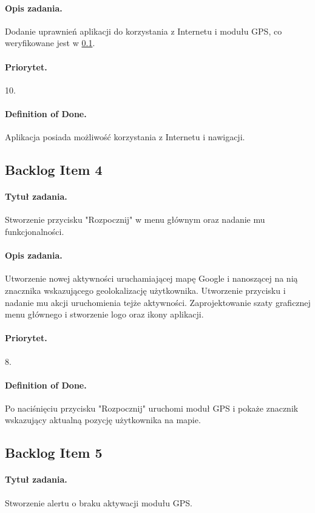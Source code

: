 \documentclass[a4paper]{article}
\begin{document}
\paragraph{Opis zadania.} Dodanie uprawnień aplikacji do korzystania z Internetu i modułu GPS, co weryfikowane jest w \ref{bl4}.
\paragraph{Priorytet.} 10.
\paragraph{Definition of Done.} Aplikacja posiada możliwość korzystania z Internetu i nawigacji.

\subsection{Backlog Item 4}
\label{bl4}
\paragraph{Tytuł zadania.} Stworzenie przycisku "Rozpocznij" w menu głównym oraz nadanie mu funkcjonalności.
\paragraph{Opis zadania.} Utworzenie nowej aktywności uruchamiającej mapę Google i nanoszącej na nią znacznika wskazującego geolokalizację użytkownika. Utworzenie przycisku i nadanie mu akcji uruchomienia tejże aktywności. Zaprojektowanie szaty graficznej menu głównego i stworzenie logo oraz ikony aplikacji.
\paragraph{Priorytet.} 8.
\paragraph{Definition of Done.} Po naciśnięciu przycisku "Rozpocznij" uruchomi moduł GPS i pokaże znacznik wskazujący aktualną pozycję użytkownika na mapie.

\subsection{Backlog Item 5}
\paragraph{Tytuł zadania.} Stworzenie alertu o braku aktywacji modułu GPS.
\end{document}
